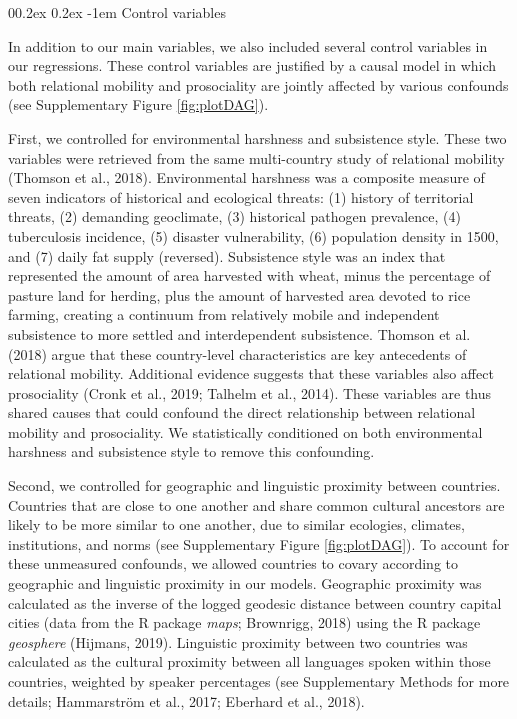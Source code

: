 \documentclass[english,man,floatsintext]{apa6}
\makeatletter
\renewcommand{\paragraph}{\@startsection{paragraph}{4}{\parindent}%
  {0\baselineskip \@plus 0.2ex \@minus 0.2ex}%
  {-1em}%
  {\normalfont\normalsize\bfseries\itshape\typesectitle}}
\makeatother
\begin{document}
\hypertarget{control-variables}{%
\paragraph{Control variables}\label{control-variables}}

In addition to our main variables, we also included several control variables in our regressions. These control variables are justified by a causal model in which both relational mobility and prosociality are jointly affected by various confounds (see Supplementary Figure \ref{fig:plotDAG}).

First, we controlled for environmental harshness and subsistence style. These two variables were retrieved from the same multi-country study of relational mobility (Thomson et al., 2018). Environmental harshness was a composite measure of seven indicators of historical and ecological threats: (1) history of territorial threats, (2) demanding geoclimate, (3) historical pathogen prevalence, (4) tuberculosis incidence, (5) disaster vulnerability, (6) population density in 1500, and (7) daily fat supply (reversed). Subsistence style was an index that represented the amount of area harvested with wheat, minus the percentage of pasture land for herding, plus the amount of harvested area devoted to rice farming, creating a continuum from relatively mobile and independent subsistence to more settled and interdependent subsistence. Thomson et al. (2018) argue that these country-level characteristics are key antecedents of relational mobility. Additional evidence suggests that these variables also affect prosociality (Cronk et al., 2019; Talhelm et al., 2014). These variables are thus shared causes that could confound the direct relationship between relational mobility and prosociality. We statistically conditioned on both environmental harshness and subsistence style to remove this confounding.

Second, we controlled for geographic and linguistic proximity between countries. Countries that are close to one another and share common cultural ancestors are likely to be more similar to one another, due to similar ecologies, climates, institutions, and norms (see Supplementary Figure \ref{fig:plotDAG}). To account for these unmeasured confounds, we allowed countries to covary according to geographic and linguistic proximity in our models. Geographic proximity was calculated as the inverse of the logged geodesic distance between country capital cities (data from the R package \emph{maps}; Brownrigg, 2018) using the R package \emph{geosphere} (Hijmans, 2019). Linguistic proximity between two countries was calculated as the cultural proximity between all languages spoken within those countries, weighted by speaker percentages (see Supplementary Methods for more details; Hammarström et al., 2017; Eberhard et al., 2018).
\end{document}
